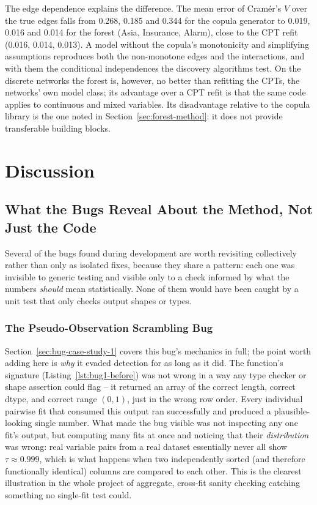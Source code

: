 \documentclass[
  english,
  class=report,
  accentcolor=2c,
  marginpar=false,
  parskip=half-,
  fontsize=11pt,
  ruledheaders=false,
  pdfa=false,
  IMRAD=false,
  thesis={type=master}
]{tudapub}
\begin{document}
The edge dependence explains the difference. The mean error of Cram\'er's
$V$ over the true edges falls from 0.268, 0.185 and 0.344 for the
copula generator to 0.019, 0.016 and 0.014 for the forest (Asia, Insurance,
Alarm), close to the CPT refit (0.016, 0.014, 0.013).
A model without the copula's monotonicity and simplifying assumptions
reproduces both the non-monotone edges and the interactions, and with them
the conditional independences the discovery algorithms test. On the
discrete networks the forest is, however, no better than refitting the
CPTs, the networks' own model class; its advantage over a CPT refit is
that the same code applies to continuous and mixed variables. Its
disadvantage relative to the copula library is the one noted in
Section~\ref{sec:forest-method}: it does not provide transferable building
blocks.

\chapter{Discussion}
\label{chap:discussion}

\section{What the Bugs Reveal About the Method, Not Just the Code}
\label{sec:bugs-discussion}
Several of the bugs found during development are worth revisiting
collectively rather than only as isolated fixes, because they share a
pattern: each one was invisible to generic testing and visible only to a
check informed by what the numbers \emph{should} mean statistically. None
of them would have been caught by a unit test that only checks output
shapes or types.

\subsection{The Pseudo-Observation Scrambling Bug}
Section~\ref{sec:bug-case-study-1} covers this bug's mechanics in full;
the point worth adding here is \emph{why} it evaded detection for as long
as it did. The function's signature (Listing~\ref{lst:bug1-before}) was
not wrong in a way any type checker or shape assertion could flag -- it
returned an array of the correct length, correct dtype, and correct range
$(0,1)$, just in the wrong row order. Every individual pairwise fit that
consumed this output ran successfully and produced a plausible-looking
single number. What made the bug visible was not inspecting any one
fit's output, but computing many fits at once and noticing that their
\emph{distribution} was wrong: real variable pairs from a real dataset
essentially never all show $\tau \approx 0.999$, which is what happens
when two independently sorted (and therefore functionally identical)
columns are compared to each other. This is the clearest illustration in
the whole project of aggregate, cross-fit sanity checking catching
something no single-fit test could.
\end{document}
